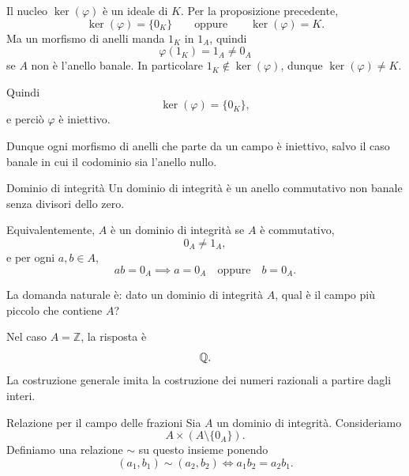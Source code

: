 \documentclass[a4paper]{article}
\begin{document}
\begin{radioactive}
\begin{snippetproof}{}
    Il nucleo \(\ker(\varphi)\) è un ideale di \(K\). Per la proposizione precedente,
    \[
        \ker(\varphi)=\{0_K\}
        \qquad
        \text{oppure}
        \qquad
        \ker(\varphi)=K.
    \]
    Ma un morfismo di anelli manda \(1_K\) in \(1_A\), quindi
    \[
        \varphi(1_K)=1_A\neq 0_A
    \]
    se \(A\) non è l'anello banale. In particolare \(1_K\notin\ker(\varphi)\), dunque \(\ker(\varphi)\neq K\).

    Quindi
    \[
        \ker(\varphi)=\{0_K\},
    \]
    e perciò \(\varphi\) è iniettivo.
\end{snippetproof}
\end{radioactive}

\begin{radioactive}
Dunque ogni morfismo di anelli che parte da un campo è iniettivo, salvo il caso banale in cui il codominio sia l'anello nullo.
\end{radioactive}

\begin{radioactive}
\begin{snippetdefinition}{Dominio di integrità}
    Un dominio di integrità è un anello commutativo non banale senza divisori dello zero.

    Equivalentemente, \(A\) è un dominio di integrità se \(A\) è commutativo,
    \[
        0_A\neq 1_A,
    \]
    e per ogni \(a,b\in A\),
    \[
        ab=0_A
        \implies
        a=0_A
        \quad
        \text{oppure}
        \quad
        b=0_A.
    \]
\end{snippetdefinition}
\end{radioactive}

\begin{radioactive}
La domanda naturale è: dato un dominio di integrità \(A\), qual è il campo più piccolo che contiene \(A\)?
\end{radioactive}

\begin{radioactive}
Nel caso \(A=\mathbb{Z}\), la risposta è
\[
    \mathbb{Q}.
\]
La costruzione generale imita la costruzione dei numeri razionali a partire dagli interi.
\end{radioactive}

\begin{radioactive}
\begin{snippetdefinition}{Relazione per il campo delle frazioni}
    Sia \(A\) un dominio di integrità.
    Consideriamo
    \[
        A\times (A\setminus\{0_A\}).
    \]
    Definiamo una relazione \(\sim\) su questo insieme ponendo
    \[
        (a_1,b_1)\sim (a_2,b_2)
        \iff
        a_1b_2=a_2b_1.
    \]
\end{snippetdefinition}
\end{radioactive}
\end{document}
